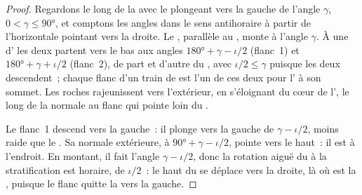 \begin{proof}
Regardons le long de la  avec le  plongeant vers la gauche de l'angle
$\gamma$, $0 < \gamma \le \ang{90}$, et comptons les angles dans le sens antihoraire à partir de
l'horizontale pointant vers la droite. Le , parallèle au , monte
à l'angle $\gamma$. À une  d' les deux  partent
vers le bas aux angles $\ang{180} + \gamma - \iota/2$ (flanc~1) et
$\ang{180} + \gamma + \iota/2$ (flanc~2), de part et d'autre du ,
avec $\iota/2 \le \gamma$ puisque les deux descendent~; chaque flanc d'un train de 
est l'un de ces deux pour l' à son sommet. Les roches rajeunissent vers l'extérieur,
en s'éloignant du cœur de l', le long de la normale au flanc qui pointe
loin du .

Le flanc~1 descend vers la gauche~: il plonge vers la gauche de $\gamma - \iota/2$, moins
raide que le . Sa normale extérieure, à $\ang{90} + \gamma -
\iota/2$, pointe vers le haut~: il est à l'endroit. En montant, il fait
l'angle $\gamma - \iota/2$, donc la rotation aiguë du  à la stratification
est horaire, de $\iota/2$~: le haut du  se déplace vers la droite,
là où est la , puisque le flanc quitte la  vers la gauche.


\end{proof}
